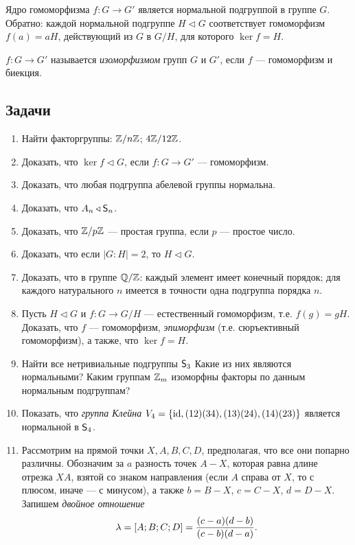 Ядро гомоморфизма $f:G\to G'$ является нормальной подгруппой в группе $G$. Обратно: каждой нормальной подгруппе $H\triangleleft G$ соответствует гомоморфизм $f(a)=aH$, действующий из $G$ в $G/H$, для которого $\ker f=H$.

$f:G\to G'$ называется \textit{изоморфизмом} групп $G$ и $G'$, если $f$ --- гомоморфизм и биекция.



\subsection*{Задачи}

\begin{enumerate}
\item Найти факторгруппы: \ipunkt $\mathbb Z/n\mathbb Z$; \ipunkt $4\mathbb Z/12\mathbb Z$.
\item Доказать, что $\ker f\triangleleft G$, если $f:G\to G'$ --- гомоморфизм.

\item Доказать, что любая подгруппа абелевой группы нормальна.
\item Доказать, что $A_n\triangleleft {\mathsf{S}}_n$.

\item Доказать, что $\mathbb Z/p\mathbb Z$ --- простая группа, если $p$ --- простое число.

\item Доказать, что если $|G:H|=2$, то $H\triangleleft G$.

\item Доказать, что в группе $\mathbb Q/\mathbb Z$: \ipunkt каждый элемент имеет конечный порядок; \ipunkt для каждого натурального $n$ имеется в точности одна подгруппа порядка $n$.

\item Пусть $H\triangleleft G$ и $f:G\to G/H$ --- естественный гомоморфизм, т.е. $f(g)=gH$. Доказать, что $f$ --- гомоморфизм, \textit{эпиморфизм} (т.е. сюръективный гомоморфизм), а также, что $\ker f=H$.

\item Найти все нетривиальные подгруппы ${\mathsf{S}}_3$ Какие из них являются нормальными? Каким группам $\mathbb Z_m$ изоморфны факторы по данным нормальным подгруппам?

\item Показать, что \textit{группа Клейна} $V_4=\{\mathrm{id},(12)(34), (13)(24), (14)(23)\}$ является нормальной в ${\mathsf{S}}_4$.

\item Рассмотрим на прямой точки $X,A,B,C,D$, предполагая, что все они попарно различны. Обозначим за $a$ разность точек $A-X$, которая равна длине отрезка $XA$, взятой со знаком направления (если $A$ справа от $X$, то с плюсом, иначе --- с минусом), а также $b=B-X$, $c=C-X$, $d=D-X$. Запишем \textit{двойное отношение}
$$
\lambda = [A;B;C;D] = \frac{(c-a)(d-b)}{(c-b)(d-a)}.
$$


\end{enumerate}
